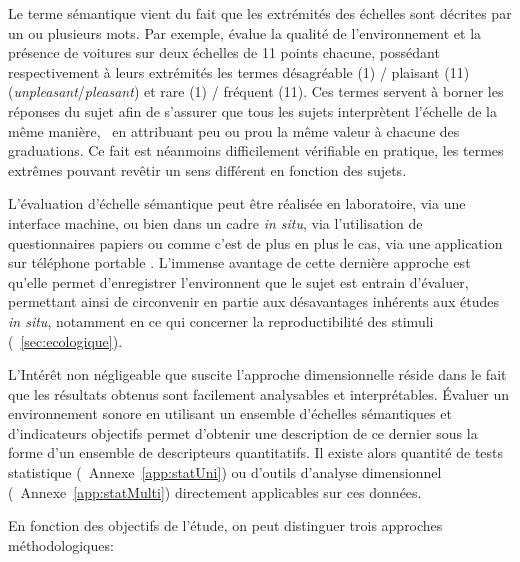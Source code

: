 Le terme sémantique vient du fait que les extrémités des échelles sont décrites par un ou plusieurs mots. Par exemple, \citep{ricciardi2015sound} évalue la qualité de l'environnement et la présence de voitures sur deux échelles de 11 points chacune, possédant respectivement à leurs extrémités les termes désagréable (1) / plaisant (11) (\emph{unpleasant}/\emph{pleasant}) et rare (1) / fréquent (11). Ces termes servent à borner les réponses du sujet afin de s'assurer que tous les sujets interprètent l'échelle de la même manière, \ie~en attribuant  peu ou prou la même valeur à chacune des graduations. Ce fait est néanmoins difficilement vérifiable en pratique, les termes extrêmes pouvant revêtir un sens différent en fonction des sujets.

L'évaluation d'échelle sémantique peut être réalisée en laboratoire, via une interface machine, ou bien dans un cadre \emph{in situ}, via l'utilisation de questionnaires papiers \citep{jeon2013soundwalk,torija2013application} ou comme c'est de plus en plus le cas, via une application sur téléphone portable \citep{kardous2014evaluation,ricciardi2015sound}. L'immense avantage de cette dernière approche est qu'elle permet d'enregistrer l'environnent que le sujet est entrain d'évaluer, permettant ainsi de circonvenir en partie aux désavantages inhérents aux études \emph{in situ}, notamment en ce qui concerner la reproductibilité des stimuli (\Cf~\ref{sec:ecologique}).

L’Intérêt non négligeable que suscite l'approche dimensionnelle réside dans le fait que les résultats obtenus sont facilement analysables et interprétables. Évaluer un environnement sonore en utilisant un ensemble d'échelles sémantiques et d’indicateurs objectifs permet d'obtenir une description de ce dernier sous la forme d'un ensemble de descripteurs quantitatifs.  Il existe alors quantité de tests statistique (\Cf~Annexe~\ref{app:statUni}) ou d'outils d'analyse dimensionnel (\Cf~Annexe~\ref{app:statMulti}) directement applicables sur ces données.

En fonction des objectifs de l'étude, on peut distinguer trois approches méthodologiques:

